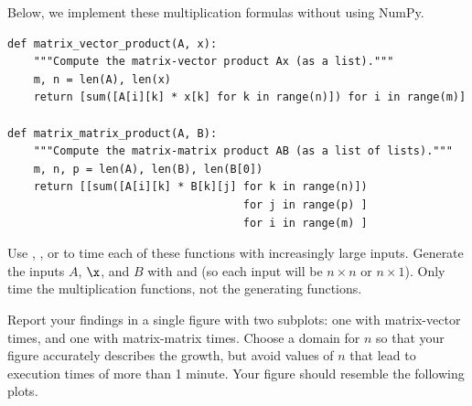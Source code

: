 \begin{problem}
Below, we implement these multiplication formulas without using NumPy.

\begin{lstlisting}
def matrix_vector_product(A, x):
    """Compute the matrix-vector product Ax (as a list)."""
    m, n = len(A), len(x)
    return [sum([A[i][k] * x[k] for k in range(n)]) for i in range(m)]

def matrix_matrix_product(A, B):
    """Compute the matrix-matrix product AB (as a list of lists)."""
    m, n, p = len(A), len(B), len(B[0])
    return [[sum([A[i][k] * B[k][j] for k in range(n)])
                                    for j in range(p) ]
                                    for i in range(m) ]
\end{lstlisting}

Use , , or  to time each of these functions with increasingly large inputs.
Generate the inputs $A$, $\x$, and $B$ with  and  (so each input will be $n \times n$ or $n \times 1$).
Only time the multiplication functions, not the generating functions.

Report your findings in a single figure with two subplots: one with matrix-vector times, and one with matrix-matrix times.
Choose a domain for $n$ so that your figure accurately describes the growth, but avoid values of $n$ that lead to execution times of more than 1 minute.
Your figure should resemble the following plots.


\end{problem}
